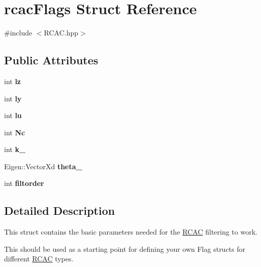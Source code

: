 \hypertarget{structrcac_flags}{}\section{rcac\+Flags Struct Reference}
\label{structrcac_flags}


{\ttfamily \#include $<$R\+C\+A\+C.\+hpp$>$}

\subsection*{Public Attributes}
\begin{DoxyCompactItemize}
\item 
\mbox{\label{structrcac_flags_aa13376ab5ff7508135b7e295891158a1}} 
int {\bfseries lz}
\item 
\mbox{\label{structrcac_flags_ad908c320c7ef724ff90df2f1adc21b5c}} 
int {\bfseries ly}
\item 
\mbox{\label{structrcac_flags_a737b88634899c9b8f5137194f55ef6f8}} 
int {\bfseries lu}
\item 
\mbox{\label{structrcac_flags_a19895c9f3b5d9a65cdf772f91b07dd33}} 
int {\bfseries Nc}
\item 
\mbox{\label{structrcac_flags_acde6690db2f46f4ba681d399b2b4a626}} 
int {\bfseries k\+\_}
\item 
\mbox{\label{structrcac_flags_a13fda3b700177ef88394b2c613d60539}} 
Eigen\+::\+Vector\+Xd {\bfseries theta\+\_}
\item 
\mbox{\label{structrcac_flags_aacd0b78521ecb3e2befe6b7597ba81a2}} 
int {\bfseries filtorder}
\end{DoxyCompactItemize}


\subsection{Detailed Description}
This struct contains the basic parameters needed for the \hyperlink{class_r_c_a_c}{R\+C\+AC} filtering to work.

This should be used as a starting point for defining your own Flag structs for different \hyperlink{class_r_c_a_c}{R\+C\+AC} types.


